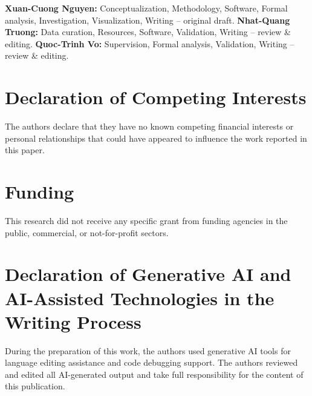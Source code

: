 \documentclass[runningheads]{llncs}
\begin{document}
\textbf{Xuan-Cuong Nguyen:} Conceptualization, Methodology, Software, Formal analysis, Investigation, Visualization, Writing -- original draft. \textbf{Nhat-Quang Truong:} Data curation, Resources, Software, Validation, Writing -- review \& editing. \textbf{Quoc-Trinh Vo:} Supervision, Formal analysis, Validation, Writing -- review \& editing.

\section*{Declaration of Competing Interests}

The authors declare that they have no known competing financial interests or personal relationships that could have appeared to influence the work reported in this paper.

\section*{Funding}

This research did not receive any specific grant from funding agencies in the public, commercial, or not-for-profit sectors.

\section*{Declaration of Generative AI and AI-Assisted Technologies in the Writing Process}

During the preparation of this work, the authors used generative AI tools for language editing assistance and code debugging support. The authors reviewed and edited all AI-generated output and take full responsibility for the content of this publication.
\end{document}
